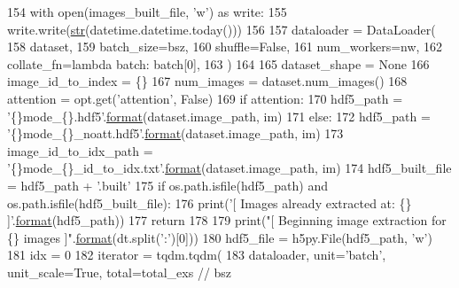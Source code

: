 \begin{DoxyCode}
154             with open(images\_built\_file, \textcolor{stringliteral}{'w'}) \textcolor{keyword}{as} write:
155                 write.write(\hyperlink{namespacegenerate__task__READMEs_a5b88452ffb87b78c8c85ececebafc09f}{str}(datetime.datetime.today()))
156 
157         dataloader = DataLoader(
158             dataset,
159             batch\_size=bsz,
160             shuffle=\textcolor{keyword}{False},
161             num\_workers=nw,
162             collate\_fn=\textcolor{keyword}{lambda} batch: batch[0],
163         )
164 
165         dataset\_shape = \textcolor{keywordtype}{None}
166         image\_id\_to\_index = \{\}
167         num\_images = dataset.num\_images()
168         attention = opt.get(\textcolor{stringliteral}{'attention'}, \textcolor{keyword}{False})
169         \textcolor{keywordflow}{if} attention:
170             hdf5\_path = \textcolor{stringliteral}{'\{\}mode\_\{\}.hdf5'}.\hyperlink{namespaceparlai_1_1chat__service_1_1services_1_1messenger_1_1shared__utils_a32e2e2022b824fbaf80c747160b52a76}{format}(dataset.image\_path, im)
171         \textcolor{keywordflow}{else}:
172             hdf5\_path = \textcolor{stringliteral}{'\{\}mode\_\{\}\_noatt.hdf5'}.\hyperlink{namespaceparlai_1_1chat__service_1_1services_1_1messenger_1_1shared__utils_a32e2e2022b824fbaf80c747160b52a76}{format}(dataset.image\_path, im)
173         image\_id\_to\_idx\_path = \textcolor{stringliteral}{'\{\}mode\_\{\}\_id\_to\_idx.txt'}.\hyperlink{namespaceparlai_1_1chat__service_1_1services_1_1messenger_1_1shared__utils_a32e2e2022b824fbaf80c747160b52a76}{format}(dataset.image\_path, im)
174         hdf5\_built\_file = hdf5\_path + \textcolor{stringliteral}{'.built'}
175         \textcolor{keywordflow}{if} os.path.isfile(hdf5\_path) \textcolor{keywordflow}{and} os.path.isfile(hdf5\_built\_file):
176             print(\textcolor{stringliteral}{'[ Images already extracted at: \{\} ]'}.\hyperlink{namespaceparlai_1_1chat__service_1_1services_1_1messenger_1_1shared__utils_a32e2e2022b824fbaf80c747160b52a76}{format}(hdf5\_path))
177             \textcolor{keywordflow}{return}
178 
179         print(\textcolor{stringliteral}{"[ Beginning image extraction for \{\} images ]"}.\hyperlink{namespaceparlai_1_1chat__service_1_1services_1_1messenger_1_1shared__utils_a32e2e2022b824fbaf80c747160b52a76}{format}(dt.split(\textcolor{stringliteral}{':'})[0]))
180         hdf5\_file = h5py.File(hdf5\_path, \textcolor{stringliteral}{'w'})
181         idx = 0
182         iterator = tqdm.tqdm(
183             dataloader, unit=\textcolor{stringliteral}{'batch'}, unit\_scale=\textcolor{keyword}{True}, total=total\_exs // bsz

\end{DoxyCode}
